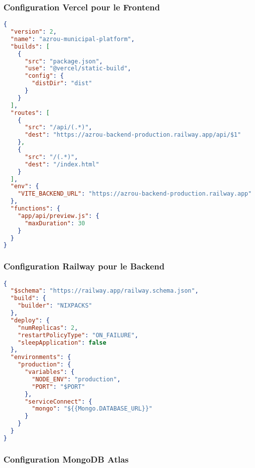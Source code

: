 \subsubsection{Configuration Vercel pour le Frontend}

\begin{lstlisting}[language=JSON, caption=vercel.json]
{
  "version": 2,
  "name": "azrou-municipal-platform",
  "builds": [
    {
      "src": "package.json",
      "use": "@vercel/static-build",
      "config": {
        "distDir": "dist"
      }
    }
  ],
  "routes": [
    {
      "src": "/api/(.*)",
      "dest": "https://azrou-backend-production.railway.app/api/$1"
    },
    {
      "src": "/(.*)",
      "dest": "/index.html"
    }
  ],
  "env": {
    "VITE_BACKEND_URL": "https://azrou-backend-production.railway.app"
  },
  "functions": {
    "app/api/preview.js": {
      "maxDuration": 30
    }
  }
}
\end{lstlisting}

\subsubsection{Configuration Railway pour le Backend}

\begin{lstlisting}[language=JSON, caption=railway.json]
{
  "$schema": "https://railway.app/railway.schema.json",
  "build": {
    "builder": "NIXPACKS"
  },
  "deploy": {
    "numReplicas": 2,
    "restartPolicyType": "ON_FAILURE",
    "sleepApplication": false
  },
  "environments": {
    "production": {
      "variables": {
        "NODE_ENV": "production",
        "PORT": "$PORT"
      },
      "serviceConnect": {
        "mongo": "${{Mongo.DATABASE_URL}}"
      }
    }
  }
}
\end{lstlisting}

\subsubsection{Configuration MongoDB Atlas}

